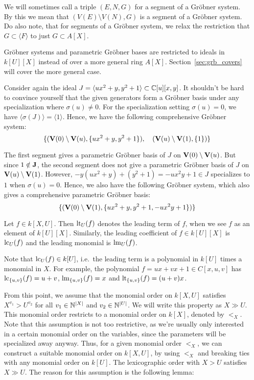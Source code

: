 We will sometimes call a triple $(E, N, G)$ for a segment of a Gröbner system. By this we mean that $(V(E) \setminus V(N), G)$ is a segment of a Gröbner system. Do also note, that for segments of a Gröbner system, we relax the restriction that $G \subset \langle F \rangle$ to just $G \subset A[X]$.

Gröbner systems and parametric Gröbner bases are restricted to ideals in $k[U][X]$ instead of over a more general ring $A[X]$. Section~\ref{sec:grb_covers} will cover the more general case.

\begin{example}\upshape
  Consider again the ideal $J = \langle ux^{2} + y, y^{2} + 1 \rangle \subset \mathbb{C}[u][x, y]$. It shouldn't be hard to convince yourself that the given generators form a Gröbner basis under any specialization where $\sigma(u) \neq 0$. For the specialization setting $\sigma(u) = 0$, we have $\langle \sigma(J) \rangle = \langle 1 \rangle$. Hence, we have the following comprehensive Gröbner system:
  \[\{(\operatorname{\mathbf V}(0) \setminus \operatorname{\mathbf V}(u), \{ux^{2} + y, y^{2} + 1\}), \quad (\operatorname{\mathbf V}(u) \setminus \operatorname{\mathbf V}(1), \{1\})\}\]

  The first segment gives a parametric Gröbner basis of $J$ on $\operatorname{\mathbf V}(0) \setminus \operatorname{\mathbf V}(u)$. But since $1 \notin \operatorname{\mathbf J}$, the second segment does not give a parametric Gröbner basis of $J$ on $\operatorname{\mathbf V}(u) \setminus \operatorname{\mathbf V}(1)$. However, $-y(ux^{2} + y) + (y^{2} + 1) = -ux^{2}y + 1 \in J$ specializes to $1$ when $\sigma(u) = 0$. Hence, we also have the following Gröbner system, which also gives a comprehensive parametric Gröbner basis:
  \[\{(\operatorname{\mathbf V}(0) \setminus \operatorname{\mathbf V}(1), \{ux^{2} + y, y^{2} + 1, -ux^{2}y + 1\})\}\]
\end{example}

\begin{definition}
  Let $f \in k[X, U]$. Then $\operatorname{lt}_{U}(f)$ denotes the leading term of $f$, when we see $f$ as an element of $k[U][X]$. Similarly, the leading coefficient of $f \in k[U][X]$ is $\operatorname{lc}_{U}(f)$ and the leading monomial is $\operatorname{lm}_{U}(f)$.
\end{definition}

Note that $\operatorname{lc}_{U}(f) \in k[U]$, i.e.\ the leading term is a polynomial in $k[U]$ times a monomial in $X$. For example, the polynomial $f = ux + vx + 1 \in C[x, u, v]$ has $\operatorname{lc}_{\{u, v\}}(f) = u + v$, $\operatorname{lm}_{\{u, v\}}(f) = x$ and $\operatorname{lt}_{\{u, v\}}(f) = (u+v)x$.

From this point, we assume that the monomial order on $k[X, U]$ satisfies $X^{v_{1}} > U^{v_{2}}$ for all $v_{1} \in \mathbb{N}^{|X|}$ and $v_{2} \in \mathbb{N}^{|U|}$. We will write this property as $X \gg U$. This monomial order restricts to a monomial order on $k[X]$, denoted by $<_{X}$. Note that this assumption is not too restrictive, as we're usually only interested in a certain monomial order on the variables, since the parameters will be specialized away anyway. Thus, for a given monomial order $<_{X}$, we can construct a suitable monomial order on $k[X, U]$, by using $<_{X}$ and breaking ties with any monomial order on $k[U]$. The lexicographic order with $X > U$ satisfies $X \gg U$. The reason for this assumption is the following lemma:

